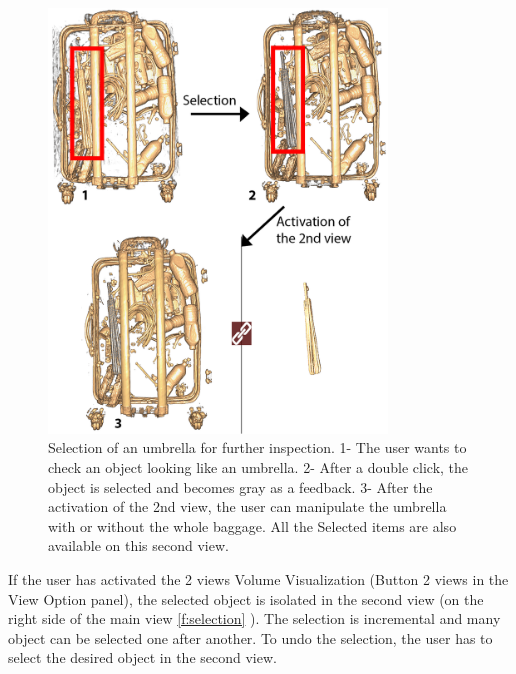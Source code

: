 \begin{figure}
\centering   
	\includegraphics[width=9cm]{Figures/selection.png}
	\caption{ Selection of an umbrella for further inspection.  1- The user wants to check an object looking like an umbrella. 2- After a double click, the object is selected and becomes gray as a feedback. 3- After the activation of the 2nd view, the user can manipulate the umbrella with or without the whole baggage. All the Selected items are also available on this second view. }
	\label{f:selection}
\end{figure}



If the user has activated the 2 views Volume Visualization (Button 2 views in the View Option panel), the selected object is isolated in the second view (on the right side of the main view \autoref{f:selection} ). The selection is incremental and many object can be selected one after another. To undo the selection, the user has to select the desired object in the second view.
